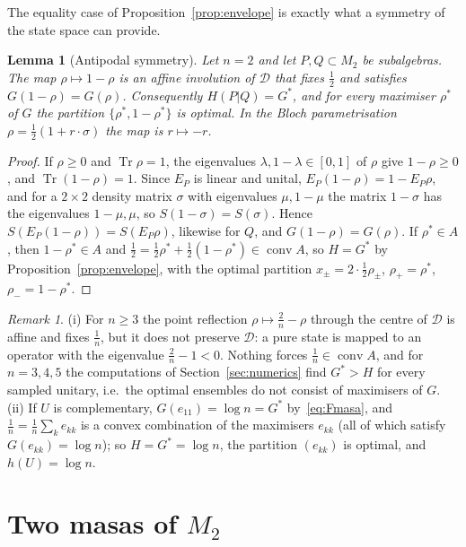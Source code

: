 \documentclass[11pt]{article}
\DeclareMathOperator{\Tr}{Tr}
\DeclareMathOperator{\conv}{conv}
\newcommand{\D}{\mathcal{D}}
\theoremstyle{plain}
\newtheorem{lemma}[theorem]{Lemma}
\theoremstyle{definition}
\theoremstyle{remark}
\newtheorem{remark}[theorem]{Remark}
\begin{document}
The equality case of Proposition~\ref{prop:envelope} is exactly what a symmetry of the state space can provide.

\begin{lemma}[Antipodal symmetry]\label{lem:antipodal}
Let $n=2$ and let $P,Q\subset M_2$ be subalgebras. The map $\rho\mapsto1-\rho$ is an affine involution of $\D$ that fixes
$\frac12$ and satisfies $G(1-\rho)=G(\rho)$. Consequently $H(P|Q)=G^*$, and for every maximiser $\rho^*$ of $G$ the partition
$\{\rho^*,1-\rho^*\}$ is optimal. In the Bloch parametrisation $\rho=\frac12(1+r\cdot\sigma)$ the map is $r\mapsto-r$.
\end{lemma}
\begin{proof}
If $\rho\ge0$ and $\Tr\rho=1$, the eigenvalues $\lambda,1-\lambda\in[0,1]$ of $\rho$ give $1-\rho\ge0$, and $\Tr(1-\rho)=1$. Since
$E_P$ is linear and unital, $E_P(1-\rho)=1-E_P\rho$, and for a $2\times2$ density matrix $\sigma$ with eigenvalues $\mu,1-\mu$ the
matrix $1-\sigma$ has the eigenvalues $1-\mu,\mu$, so $S(1-\sigma)=S(\sigma)$. Hence $S(E_P(1-\rho))=S(E_P\rho)$, likewise for $Q$, and
$G(1-\rho)=G(\rho)$. If $\rho^*\in A$, then $1-\rho^*\in A$ and $\frac12=\frac12\rho^*+\frac12(1-\rho^*)\in\conv A$, so $H=G^*$ by
Proposition~\ref{prop:envelope}, with the optimal partition $x_\pm=2\cdot\frac12\rho_\pm$, $\rho_+=\rho^*$, $\rho_-=1-\rho^*$.
\end{proof}

\begin{remark}\label{rem:envelope}
(i) For $n\ge3$ the point reflection $\rho\mapsto\frac2n-\rho$ through the centre of $\D$ is affine and fixes $\frac1n$, but it
does not preserve $\D$: a pure state is mapped to an operator with the eigenvalue $\frac2n-1<0$. Nothing forces
$\frac1n\in\conv A$, and for $n=3,4,5$ the computations of Section~\ref{sec:numerics} find $G^*>H$ for every sampled unitary,
i.e.\ the optimal ensembles do not consist of maximisers of $G$.
(ii) If $U$ is complementary, $G(e_{11})=\log n=G^*$ by~\eqref{eq:Fmasa}, and $\frac1n=\frac1n\sum_ke_{kk}$ is a convex
combination of the maximisers $e_{kk}$ (all of which satisfy $G(e_{kk})=\log n$); so $H=G^*=\log n$, the partition
$(e_{kk})$ is optimal, and $h(U)=\log n$.
\end{remark}

\section{Two masas of \texorpdfstring{$M_2$}{M2}}\label{sec:n2}
\end{document}
